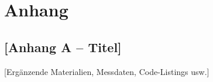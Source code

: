 \chapter{Anhang}
\label{chap:anhang}

\section{[Anhang A – Titel]}

[Ergänzende Materialien, Messdaten, Code-Listings usw.]

